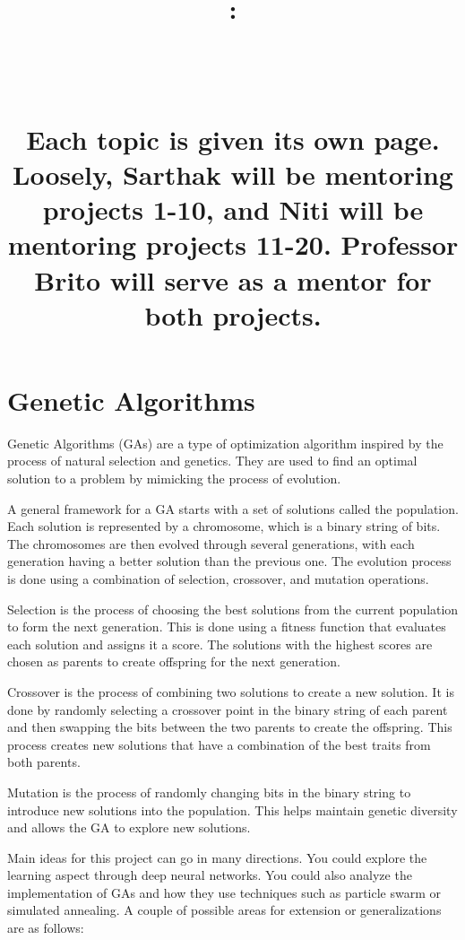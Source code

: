 \documentclass{article}
\title{
    \vspace{2in}
    \textbf{\hmwkClass:\\ \hmwkTitle} \\
    \vspace{0.1in}\large{\textit{\hmwkClassInstructor\ \hmwkSection}} \\
    \vspace{1in}
    \begin{minipage}[t]{0.5\columnwidth}
    {\footnotesize Each topic is given its own page. Loosely, Sarthak will be mentoring projects 1-10, and Niti will be mentoring projects 11-20. Professor Brito will serve as a mentor for both projects.}
    \end{minipage}
    \vspace{1in}
    \author{\textbf{\hmwkAuthorName}}
    \date{}
}
\begin{document}
\maketitle
\pagebreak

\section{Genetic Algorithms}

    Genetic Algorithms (GAs) are a type of optimization algorithm inspired by the process of natural selection and genetics. They are used to find an optimal solution to a problem by mimicking the process of evolution.
    
    \vspace{3mm}
    A general framework for a GA starts with a set of solutions called the population. Each solution is represented by a chromosome, which is a binary string of bits. The chromosomes are then evolved through several generations, with each generation having a better solution than the previous one. The evolution process is done using a combination of selection, crossover, and mutation operations.
    
    \vspace{3mm}
    Selection is the process of choosing the best solutions from the current population to form the next generation. This is done using a fitness function that evaluates each solution and assigns it a score. The solutions with the highest scores are chosen as parents to create offspring for the next generation.
    
    \vspace{3mm}
    Crossover is the process of combining two solutions to create a new solution. It is done by randomly selecting a crossover point in the binary string of each parent and then swapping the bits between the two parents to create the offspring. This process creates new solutions that have a combination of the best traits from both parents.
    
    \vspace{3mm}
    Mutation is the process of randomly changing bits in the binary string to introduce new solutions into the population. This helps maintain genetic diversity and allows the GA to explore new solutions.
    
    \vspace{3mm}
    Main ideas for this project can go in many directions. You could explore the learning aspect through deep neural networks. You could also analyze the implementation of GAs and how they use techniques such as particle swarm or simulated annealing. A couple of possible areas for extension or generalizations are as follows:
    
\end{document}
